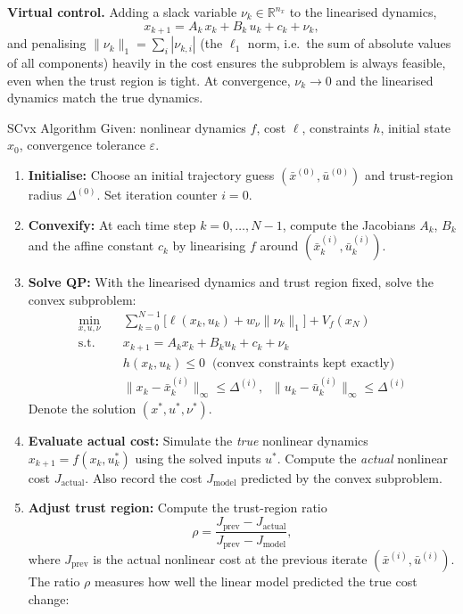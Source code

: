 \textbf{Virtual control.} Adding a slack variable $\nu_k \in \mathbb{R}^{n_x}$ to the linearised dynamics,
\[
x_{k+1} = A_k\, x_k + B_k\, u_k + c_k + \nu_k,
\]
and penalising $\|\nu_k\|_1 = \sum_i |\nu_{k,i}|$ (the $\ell_1$ norm, i.e.\ the sum of absolute values of all components) heavily in the cost ensures the subproblem is always feasible, even when the trust region is tight. At convergence, $\nu_k \to 0$ and the linearised dynamics match the true dynamics.

\begin{defnbox}{SCvx Algorithm}
	Given: nonlinear dynamics $f$, cost $\ell$, constraints $h$, initial state $x_0$, convergence tolerance $\varepsilon$.
	\begin{enumerate}[nosep]
		\item \textbf{Initialise:} Choose an initial trajectory guess $(\bar{x}^{(0)}, \bar{u}^{(0)})$ and trust-region radius $\Delta^{(0)}$. Set iteration counter $i = 0$.
		\item \textbf{Convexify:} At each time step $k = 0, \dots, N{-}1$, compute the Jacobians $A_k$, $B_k$ and the affine constant $c_k$ by linearising $f$ around $(\bar{x}_k^{(i)}, \bar{u}_k^{(i)})$.
		\item \textbf{Solve QP:} With the linearised dynamics and trust region fixed, solve the convex subproblem:
		\begin{align*}
			\min_{x, u, \nu} \quad & \sum_{k=0}^{N-1} \bigl[\ell(x_k, u_k) + w_\nu \|\nu_k\|_1\bigr] + V_f(x_N) \\
			\text{s.t.} \quad & x_{k+1} = A_k x_k + B_k u_k + c_k + \nu_k \\
			& h(x_k, u_k) \le 0 \;\;\text{(convex constraints kept exactly)} \\
			& \|x_k - \bar{x}_k^{(i)}\|_\infty \le \Delta^{(i)},\;\; \|u_k - \bar{u}_k^{(i)}\|_\infty \le \Delta^{(i)}
		\end{align*}
		Denote the solution $(x^*, u^*, \nu^*)$.
		\item \textbf{Evaluate actual cost:} Simulate the \emph{true} nonlinear dynamics $x_{k+1} = f(x_k, u_k^*)$ using the solved inputs $u^*$. Compute the \emph{actual} nonlinear cost $J_{\text{actual}}$. Also record the cost $J_{\text{model}}$ predicted by the convex subproblem.
		\item \textbf{Adjust trust region:} Compute the trust-region ratio
		\[
			\rho = \frac{J_{\text{prev}} - J_{\text{actual}}}{J_{\text{prev}} - J_{\text{model}}},
		\]
		where $J_{\text{prev}}$ is the actual nonlinear cost at the previous iterate $(\bar{x}^{(i)}, \bar{u}^{(i)})$. The ratio $\rho$ measures how well the linear model predicted the true cost change:

\end{enumerate}
\end{defnbox}
